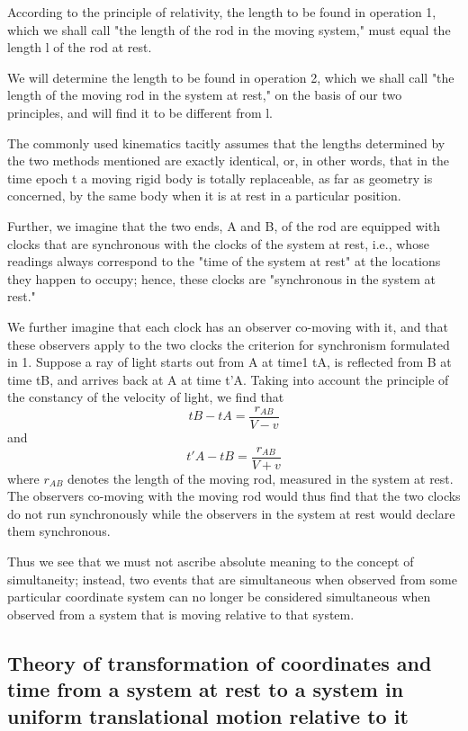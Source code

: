 ﻿\documentclass{article} %
\begin{document}
According to the principle of relativity, the length to be found in operation 1, which we shall call "the length of the rod in the moving system," must equal the length l of the rod at rest. 

We will determine the length to be found in operation 2, which we shall call "the length of the moving rod in the system at rest," on the basis of our two principles, and will find it to be different from l. 

The commonly used kinematics tacitly assumes that the lengths determined by the two methods mentioned are exactly identical, or, in other words, that in the time epoch t a moving rigid body is totally replaceable, as far as geometry is concerned, by the same body when it is at rest in a particular position. 

Further, we imagine that the two ends, A and B, of the rod are equipped with clocks that are synchronous with the clocks of the system at rest, i.e., whose readings always correspond to the "time of the system at rest" at the locations they happen to occupy; hence, these clocks are "synchronous in the system at rest." 

We further imagine that each clock has an observer co-moving with it, and that these observers apply to the two clocks the criterion for synchronism formulated in 1. 
Suppose a ray of light starts out from A at time1 tA, is reflected from B at time tB, and arrives back at A at time t'A. 
Taking into account the principle of the constancy of the velocity of light, we find that 
\begin{equation} tB-tA=\frac{r_{AB}}{V-v} \nonumber\end{equation}
and  
\begin{equation} t'A-tB=\frac{r_{AB}}{V+v} \nonumber\end{equation}
where $r_{AB}$ denotes the length of the moving rod, measured in the system at rest. 
The observers co-moving with the moving rod would thus find that the two clocks do not run synchronously while the observers in the system at rest would declare them synchronous.

Thus we see that we must not ascribe absolute meaning to the concept of simultaneity; instead, two events that are simultaneous when observed from some particular coordinate system can no longer be considered simultaneous when observed from a system that is moving relative to that system.  

\subsection{ 
Theory of transformation of coordinates and time from a system at rest to a system in uniform translational motion relative to it 
}
\end{document}

